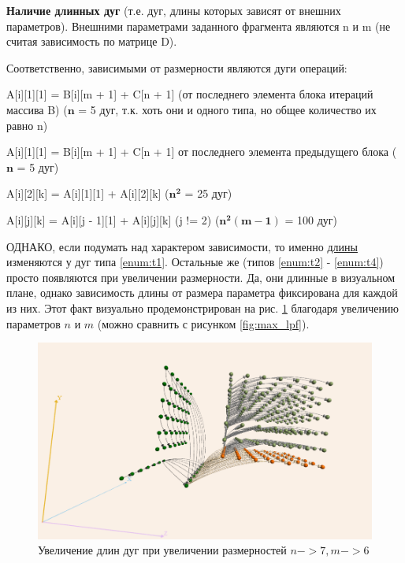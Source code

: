 \documentclass[12pt, fleqn]{article}
\theoremstyle{definition}
\newenvironment{packed_enum}{
\begin{enumerate}
  \setlength{\itemsep}{1pt}
  \setlength{\parskip}{0pt}
  \setlength{\parsep}{0pt}
}{\end{enumerate}}
\begin{document}
\begin{packed_enum}
 \item \textbf{Наличие длинных дуг} (т.е. дуг, длины которых зависят от внешних параметров). Внешними параметрами заданного фрагмента являются n и m (не считая зависимость по матрице D).
 
 Соответственно, зависимыми от размерности являются дуги операций:
 \begin{packed_enum}
  \item \label{enum:t1} A[i][1][1] = B[i][m + 1] + C[n + 1] (от последнего элемента блока итераций массива B) ($\mathbf{n}$ = 5 дуг, т.к. хоть они и одного типа, но общее количество их равно n)
  \item \label{enum:t2} A[i][1][1] = B[i][m + 1] + C[n + 1] от последнего элемента предыдущего блока ($\mathbf{n}$ = 5 дуг)
  \item \label{enum:t3} A[i][2][k] = A[i][1][1] + A[i][2][k] ($\mathbf{n^2}$ = 25 дуг)
  \item \label{enum:t4} A[i][j][k] = A[i][j - 1][1] + A[i][j][k] (j != 2) ($\mathbf{n^2 (m - 1)}$ = 100 дуг)
 \end{packed_enum}
 
ОДНАКО, если подумать над характером зависимости, то именно \underline{длины} изменяются у дуг типа \ref{enum:t1}. Остальные же (типов \ref{enum:t2} - \ref{enum:t4}) просто появляются при увеличении размерности. Да, они длинные в визуальном плане, однако зависимость длины от размера параметра фиксирована для каждой из них. Этот факт визуально продемонстрирован на рис. \ref{fig:length} благодаря увеличению параметров $n$ и $m$ (можно сравнить с рисунком \ref{fig:max_lpf}).
 \begin{figure}[ht]
\begin{center}
 \includegraphics[scale=0.96]{lengths.png}
 \caption{Увеличение длин дуг при увеличении размерностей $n->7, m->6$}
 \label{fig:length}
\end{center}
\end{figure}


\end{packed_enum}
\end{document}
